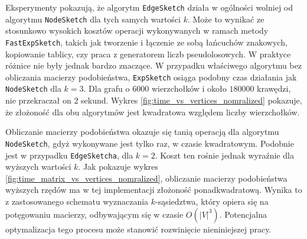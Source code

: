 Eksperymenty pokazują, że algorytm \texttt{EdgeSketch} działa w ogólności wolniej od algorytmu \texttt{NodeSketch} dla tych samych wartości $k$. Może to wynikać ze stosunkowo wysokich kosztów operacji wykonywanych w ramach metody \texttt{FastExpSketch}, takich jak tworzenie i łączenie ze sobą łańcuchów znakowych, kopiowanie tablicy, czy praca z generatorem liczb pseudolosowych. W praktyce różnice nie były jednak bardzo znaczące. W przypadku właściwego algorytmu bez obliczania macierzy podobieństwa, \texttt{ExpSketch} osiąga podobny czas działania jak \texttt{NodeSketch} dla $k = 3$. Dla grafu o $6000$ wierzchołków i około $180000$ krawędzi, nie przekraczał on $2$ sekund. Wykres \ref{fig:time_vs_vertices_nomralized} pokazuje, że złożoność dla obu algorytmów jest kwadratowa względem liczby wierzchołków. 

Obliczanie macierzy podobieństwa okazuje się tanią operacją dla algorytmu \texttt{NodeSketch}, gdyż wykonywane jest tylko raz, w czasie kwadratowym. Podobnie jest w przypadku \texttt{EdgeSketcha}, dla $k=2$. Koszt ten rośnie jednak wyraźnie dla wyższych wartości $k$. Jak pokazuje wykres \ref{fig:time_matrix_vs_vertices_nomralized}, obliczanie macierzy podobieństwa wyższych rzędów ma w tej implementacji złożoność ponadkwadratową. Wynika to z zastosowanego schematu wyznaczania $k$-sąsiedztwa, który opiera się na potęgowaniu macierzy, odbywającym się w czasie $O(|V|^3)$. Potencjalna optymalizacja tego procesu może stanowić rozwinięcie nieniniejszej pracy.  